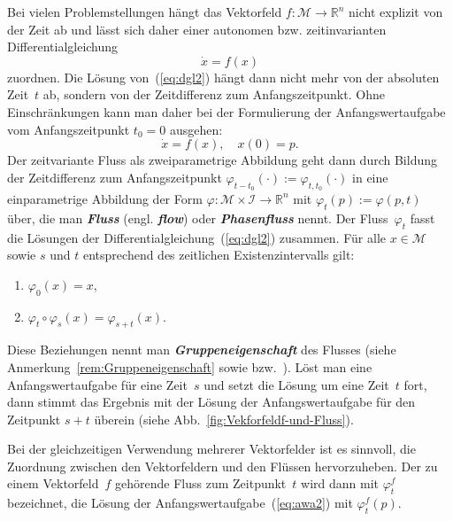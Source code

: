 Bei vielen Problemstellungen hängt das Vektorfeld $f:\mathcal{M}\to{\mathbb{R}}^{n}$
nicht explizit von der Zeit ab und lässt sich daher einer autonomen
bzw. zeitinvarianten Differentialgleichung
\begin{equation}
\dot{x}=f(x)\label{eq:dgl2}
\end{equation}
zuordnen. Die Lösung von~(\ref{eq:dgl2}) hängt dann nicht mehr von
der absoluten Zeit~$t$ ab, sondern von der Zeitdifferenz zum Anfangszeitpunkt.
Ohne Einschränkungen kann man daher bei der Formulierung der Anfangswertaufgabe
vom Anfangszeitpunkt $t_{0}=0$ ausgehen:
\begin{equation}
\dot{x}=f(x),\quad x(0)=p.\label{eq:awa2}
\end{equation}
Der zeitvariante Fluss als zweiparametrige Abbildung geht dann durch
Bildung der Zeitdifferenz zum Anfangszeitpunkt $\varphi_{t-t_{0}}(\cdot):=\varphi_{t,t_{0}}(\cdot)$
in eine einparametrige Abbildung der Form $\varphi:\mathcal{M}\times\mathcal{I}\to{\mathbb{R}}^{n}$
mit $\varphi_{t}(p):=\varphi(p,t)$ über, die man \textbf{\em Fluss}
(engl. \textbf{\em flow}) oder \textbf{\em Phasenfluss} nennt. Der Fluss~$\varphi_{t}$
fasst die Lösungen der Differentialgleichung~(\ref{eq:dgl2}) zusammen.
Für alle $x\in\mathcal{M}$ sowie $s$ und $t$ entsprechend des zeitlichen
Existenzintervalls gilt:
\begin{enumerate}
\item $\varphi_{0}(x)=x$,
\item $\varphi_{t}\circ\varphi_{s}(x)=\varphi_{s+t}(x)$.
\end{enumerate}
Diese Beziehungen nennt man \textbf{\em Gruppeneigenschaft}
des Flusses (siehe Anmerkung~\ref{rem:Gruppeneigenschaft} sowie
\cite[§~4]{arnold2001} bzw.~\cite{fischer2014band2}). Löst man
eine Anfangswertaufgabe für eine Zeit~$s$ und setzt die Lösung um
eine Zeit~$t$ fort, dann stimmt das Ergebnis mit der Lösung der
Anfangswertaufgabe für den Zeitpunkt $s+t$ überein (siehe Abb.~\ref{fig:Vekforfeldf-und-Fluss}).



Bei der gleichzeitigen Verwendung mehrerer Vektorfelder ist es sinnvoll,
die Zuordnung zwischen den Vektor\-feldern und den Flüssen hervorzuheben.
Der zu einem Vektor\-feld~$f$ gehörende Fluss zum Zeitpunkt~$t$
wird dann mit $\varphi_{t}^{f}$ bezeichnet, die Lösung der Anfangswertaufgabe~(\ref{eq:awa2})
mit $\varphi_{t}^{f}(p)$.

